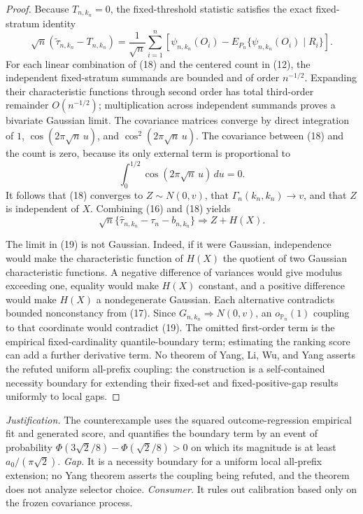 \documentclass{article}
\begin{document}
\begin{proof}
Because \(T_{n,k_n}=0\), the fixed-threshold statistic satisfies the exact fixed-stratum identity
\[
 \sqrt n(\widetilde\tau_{n,k_n}-T_{n,k_n})
 =\frac1{\sqrt n}\sum_{i=1}^n
 \left[\psi_{n,k_n}(O_i)
 -E_{P_n}\{\psi_{n,k_n}(O_i)\mid R_i\}\right].
\tag{18}
\]
For each linear combination of (18) and the centered count in (12), the independent fixed-stratum summands are bounded and of order \(n^{-1/2}\).  Expanding their characteristic functions through second order has total third-order remainder \(O(n^{-1/2})\); multiplication across independent summands proves a bivariate Gaussian limit.  The covariance matrices converge by direct integration of \(1\), \(\cos(2\pi\sqrt n\,u)\), and \(\cos^2(2\pi\sqrt n\,u)\).  The covariance between (18) and the count is zero, because its only external term is proportional to
\[
 \int_0^{1/2}\cos(2\pi\sqrt n\,u)\,du=0.
\]
It follows that (18) converges to \(Z\sim N(0,v)\), that \(\Gamma_n(k_n,k_n)\to v\), and that \(Z\) is independent of \(X\).  Combining (16) and (18) yields
\[
 \sqrt n\{\widehat\tau_{n,k_n}-\tau_n-b_{n,k_n}\}
 \Rightarrow Z+H(X).
\tag{19}
\]

The limit in (19) is not Gaussian.  Indeed, if it were Gaussian, independence would make the characteristic function of \(H(X)\) the quotient of two Gaussian characteristic functions.  A negative difference of variances would give modulus exceeding one, equality would make \(H(X)\) constant, and a positive difference would make \(H(X)\) a nondegenerate Gaussian.  Each alternative contradicts bounded nonconstancy from (17).  Since \(G_{n,k_n}\Rightarrow N(0,v)\), an \(o_{\mathbb P_n}(1)\) coupling to that coordinate would contradict (19).  The omitted first-order term is the empirical fixed-cardinality quantile-boundary term; estimating the ranking score can add a further derivative term.  No theorem of Yang, Li, Wu, and Yang asserts the refuted uniform all-prefix coupling: the construction is a self-contained necessity boundary for extending their fixed-set and fixed-positive-gap results uniformly to local gaps.
\end{proof}
\par\smallskip\noindent \textit{Justification.} The counterexample uses the squared outcome-regression empirical fit and generated score, and quantifies the boundary term by an event of probability \(\Phi(3\sqrt2/8)-\Phi(\sqrt2/8)>0\) on which its magnitude is at least \(a_0/(\pi\sqrt2)\). \textit{Gap.} It is a necessity boundary for a uniform local all-prefix extension; no Yang theorem asserts the coupling being refuted, and the theorem does not analyze selector choice. \textit{Consumer.} It rules out calibration based only on the frozen covariance process.
\end{document}
